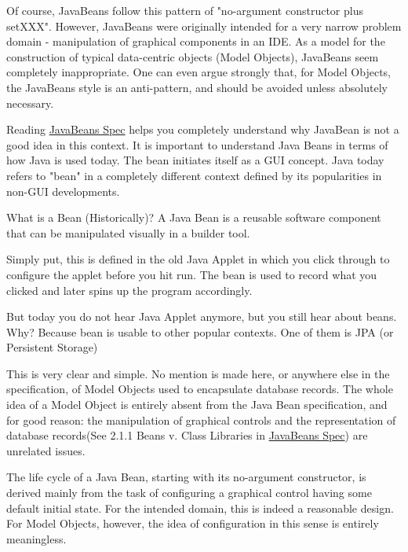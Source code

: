 Of course, JavaBeans follow this pattern of "no-argument constructor plus setXXX". However, JavaBeans were originally intended for a very narrow problem domain - manipulation of graphical components in an IDE. As a model for the construction of typical data-centric objects (Model Objects), JavaBeans seem completely inappropriate. One can even argue strongly that, for Model Objects, the JavaBeans style is an anti-pattern, and should be avoided unless absolutely necessary.

Reading \href{https://www.oracle.com/technetwork/java/javase/documentation/spec-136004.html}{JavaBeans Spec} helps you completely understand why JavaBean is not a good idea in this context. It is important to understand Java Beans in terms of how Java is used today. The bean initiates itself as a GUI concept. Java today refers to "bean" in a completely different context defined by its popularities in non-GUI developments.

\begin{definition}{What is a Bean (Historically)?}
A Java Bean is a reusable software component that can be manipulated visually in a builder tool.
\end{definition}

Simply put, this is defined in the old Java Applet in which you click through to configure the applet before you hit run. The bean is used to record what you clicked and later spins up the program accordingly.

But today you do not hear Java Applet anymore, but you still hear about beans. Why? Because bean is usable to other popular contexts. One of them is JPA (or Persistent Storage)

This is very clear and simple. No mention is made here, or anywhere else in the specification, of Model Objects used to encapsulate database records. The whole idea of a Model Object is entirely absent from the Java Bean specification, and for good reason: the manipulation of graphical controls and the representation of database records(See 2.1.1 Beans v. Class Libraries in \href{https://www.oracle.com/technetwork/java/javase/documentation/spec-136004.html}{JavaBeans Spec}) are unrelated issues.

The life cycle of a Java Bean, starting with its no-argument constructor, is derived mainly from the task of configuring a graphical control having some default initial state. For the intended domain, this is indeed a reasonable design. For Model Objects, however, the idea of configuration in this sense is entirely meaningless.

